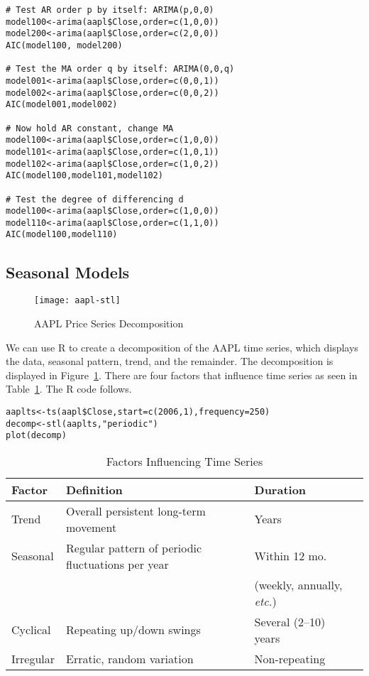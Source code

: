 \begin{verbatim}
# Test AR order p by itself: ARIMA(p,0,0)
model100<-arima(aapl$Close,order=c(1,0,0))
model200<-arima(aapl$Close,order=c(2,0,0))
AIC(model100, model200)

# Test the MA order q by itself: ARIMA(0,0,q)
model001<-arima(aapl$Close,order=c(0,0,1))
model002<-arima(aapl$Close,order=c(0,0,2))
AIC(model001,model002)

# Now hold AR constant, change MA
model100<-arima(aapl$Close,order=c(1,0,0))
model101<-arima(aapl$Close,order=c(1,0,1))
model102<-arima(aapl$Close,order=c(1,0,2))
AIC(model100,model101,model102)

# Test the degree of differencing d
model100<-arima(aapl$Close,order=c(1,0,0))
model110<-arima(aapl$Close,order=c(1,1,0))
AIC(model100,model110)
\end{verbatim}

\subsection{Seasonal Models}
\begin{figure}[tb]
  \centering
  \texttt{[image: aapl-stl]}
  \caption{AAPL Price Series Decomposition}
  \label{figure:aapl-stl}
\end{figure}

We can use R to create a decomposition of the AAPL time series, which displays the data, seasonal pattern, trend, and the remainder. The decomposition is displayed in Figure~\ref{figure:aapl-stl}. There are four factors that influence time series as seen in Table~\ref{tab:factors-ts}. The R code follows.
\begin{verbatim}
aaplts<-ts(aapl$Close,start=c(2006,1),frequency=250)
decomp<-stl(aaplts,"periodic")
plot(decomp)
\end{verbatim}

\begin{table}[htbp]
	\centering
	\begin{tabular}{llll}
	\toprule
	Factor & Definition & Duration \\
	\hline
	Trend & Overall persistent long-term movement & Years \\
	Seasonal & Regular pattern of periodic fluctuations per year & Within 12 mo. \\
	& & (weekly, annually, \textit{etc.}) \\
	Cyclical &	Repeating up/down swings & Several (2--10) years \\
	Irregular &	 Erratic, random variation & Non-repeating \\
	\bottomrule
	\end{tabular}
	\caption{Factors Influencing Time Series}
	\label{tab:factors-ts}
\end{table}

